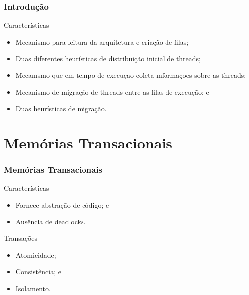 \documentclass[10pt, pdf,xcolor=pdftex,dvipsnames,table]{beamer}
\begin{document}
\begin{frame} \frametitle{Introdução}
    \begin{block}{Características}
        \begin{itemize}
        	\item Mecanismo para leitura da arquitetura e criação de filas;
        	\item Duas diferentes heurísticas de distribuição inicial de threads;
        	\item Mecanismo que em tempo de execução coleta informações sobre as threads;
        	\item Mecanismo de migração de threads entre as filas de execução; e
        	\item Duas heurísticas de migração.            
        \end{itemize}
    \end{block}
\end{frame}

\section{Memórias Transacionais}

\begin{frame} \frametitle{Memórias Transacionais}
    \begin{block}{Características}
        \begin{itemize}
        	\item Fornece abstração de código; e
        	\item Ausência de deadlocks.
        \end{itemize}
    \end{block}
    
    \begin{block}{Transações}
        \begin{itemize}
        	\item Atomicidade;
        	\item Consistência; e
        	\item Isolamento.
        \end{itemize}
    \end{block}
\end{frame}
\end{document}
